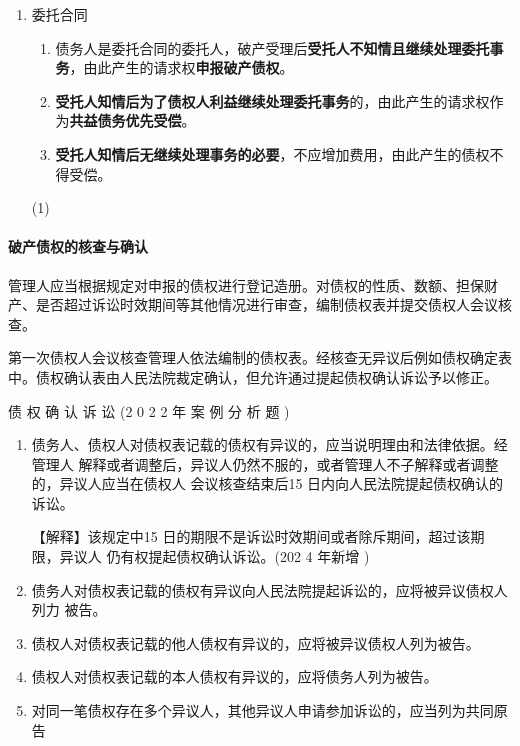 \documentclass[UTF8,12pt]{ctexart}
\numberwithin{equation}{section} %
\numberwithin{figure}{section}
\numberwithin{table}{section}
\begin{document}
\begin{enumerate}
		\item 委托合同 
		\begin{enumerate}
			\item 债务人是委托合同的委托人，破产受理后\textbf{受托人不知情且继续处理委托事务}，由此产生的请求权\textbf{申报破产债权}。
			
			\item \textbf{受托人知情后为了债权人利益继续处理委托事务}的，由此产生的请求权作为\textbf{共益债务优先受偿}。
			
			\item \textbf{受托人知情后无继续处理事务的必要}，不应增加费用，由此产生的债权不得受偿。
		\end{enumerate}(1)
	\end{enumerate}

	\paragraph{破产债权的核查与确认}
	管理人应当根据规定对申报的债权进行登记造册。对债权的性质、数额、担保财产、是否超过诉讼时效期间等其他情况进行审查，编制债权表并提交债权人会议核查。
	
	第一次债权人会议核查管理人依法编制的债权表。经核查无异议后例如债权确定表中。债权确认表由人民法院裁定确认，但允许通过提起债权确认诉讼予以修正。
	
	债 权 确 认 诉 讼 (2 0 2 2 年 案 例 分 析 题 )
	\begin{enumerate}
		\item 债务人、债权人对债权表记载的债权有异议的，应当说明理由和法律依据。经管理人 解释或者调整后，异议人仍然不服的，或者管理人不子解释或者调整的，异议人应当在债权人 会议核查结束后15 日内向人民法院提起债权确认的诉讼。
		
		【解释】该规定中15 日的期限不是诉讼时效期间或者除斥期间，超过该期限，异议人 仍有权提起债权确认诉讼。(202 4 年新增 )
		
		\item 债务人对债权表记载的债权有异议向人民法院提起诉讼的，应将被异议债权人列力 被告。
		
		\item 债权人对债权表记载的他人债权有异议的，应将被异议债权人列为被告。 
		
		\item 债权人对债权表记载的本人债权有异议的，应将债务人列为被告。
		
		\item 对同一笔债权存在多个异议人，其他异议人申请参加诉讼的，应当列为共同原告
	\end{enumerate}
\end{document}

